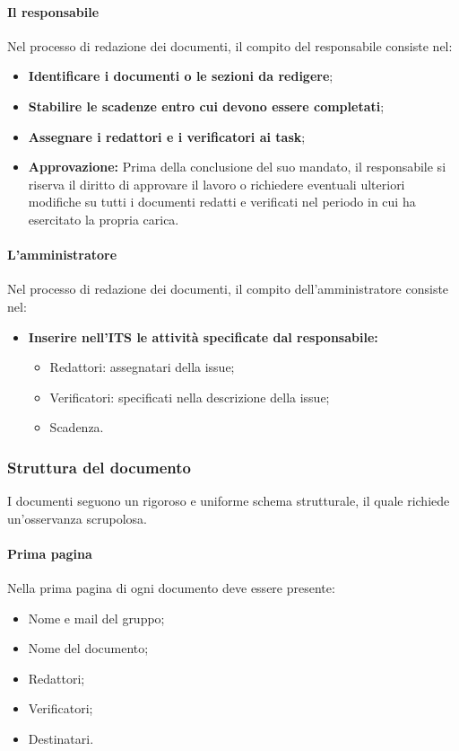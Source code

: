 \paragraph{Il responsabile}
Nel processo di redazione dei documenti, il compito del responsabile consiste nel:
\begin{itemize}
    \item \textbf{Identificare i documenti o le sezioni da redigere};
    \item \textbf{Stabilire le scadenze entro cui devono essere completati};
    \item \textbf{Assegnare i redattori e i verificatori ai task};
    \item \textbf{Approvazione:} Prima della conclusione del suo mandato, il responsabile si riserva il diritto di approvare il lavoro o richiedere eventuali ulteriori modifiche su tutti i documenti redatti e verificati nel periodo in cui ha esercitato la propria carica.
\end{itemize}

\paragraph{L'amministratore}
Nel processo di redazione dei documenti, il compito dell'amministratore consiste nel:
\begin{itemize}
    \item \textbf{Inserire nell'ITS le attività specificate dal responsabile:}
    \begin{itemize}
              \item Redattori: assegnatari della issue;
              \item Verificatori: specificati nella descrizione della issue;
              \item Scadenza.
          \end{itemize}
\end{itemize}

\subsubsection{Struttura del documento}
\label{subsubsec:strutturadocumento}
I documenti seguono un rigoroso e uniforme schema strutturale, il quale richiede un'osservanza scrupolosa.

\paragraph*{Prima pagina}
Nella prima pagina di ogni documento deve essere presente:
\begin{itemize}
    \item Nome e mail del gruppo;
    \item Nome del documento;
    \item Redattori;
    \item Verificatori;
    \item Destinatari.
\end{itemize}

